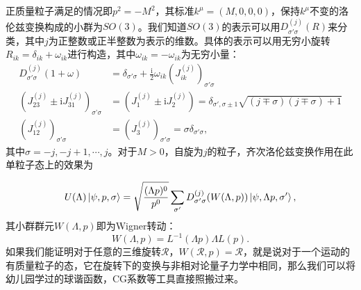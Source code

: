 正质量粒子满足的情况即$ p^{2} =-M^{2}$，其标准$ k^{\mu } =( M,0,0,0)$，保持$ k^{\mu }$不变的洛伦兹变换构成的小群为$ SO( 3)$。我们知道$ SO( 3)$的表示可以用$ D_{\sigma '\sigma }^{( j)}( R)$来分类，其中$ j$为正整数或正半整数为表示的维数。具体的表示可以用无穷小旋转$ R_{ik} =\delta _{ik} +\omega _{ik}$进行构造，其中$ \omega _{ik} =-\omega _{ik}$为无穷小量：
\begin{equation*}
	\begin{aligned}
		D_{\sigma '\sigma }^{( j)}( 1+\omega ) & =\delta _{\sigma '\sigma } +\frac{\mathrm{i}}{2} \omega _{ik} (J_{ik}^{( j)} )_{\sigma '\sigma }\\
		(J_{23}^{( j)} \pm \mathrm{i} J_{31}^{( j)} )_{\sigma ’\sigma } & =(J_{1}^{( j)} \pm \mathrm{i} J_{2}^{( j)} )=\delta _{\sigma ',\sigma \pm 1}\sqrt{( j\mp \sigma )( j\mp \sigma ) +1}\\
		(J_{12}^{( j)} )_{\sigma ’\sigma } & =(J_{3}^{( j)} )_{\sigma '\sigma } =\sigma \delta _{\sigma '\sigma } ,
	\end{aligned}
\end{equation*}
其中$ \sigma =-j,-j+1,\cdots ,j$。对于$ M >0$，自旋为$ j$的粒子，齐次洛伦兹变换作用在此单粒子态上的效果为

\begin{equation}
	U( \Lambda )\ket{\psi ,p,\sigma } =\sqrt{\frac{( \Lambda p)^{0}}{p^{0}}}\sum _{\sigma '} D_{\sigma '\sigma }^{( j)}( W( \Lambda ,p))\ket{\psi ,\Lambda p,\sigma '} ,
	\label{eq:lorentz_trans_on_single_particle_state}
\end{equation}其小群群元$ W( \Lambda ,p)$即为Wigner转动：
\begin{equation}
	W( \Lambda ,p) =L^{-1}( \Lambda p) \Lambda L( p) .
	\label{eq:little_grp_element}
\end{equation}
如果我们能证明对于任意的三维旋转$ \mathcal{R}$，$ W(\mathcal{R} ,p) =\mathcal{R}$，就是说对于一个运动的有质量粒子的态，它在旋转下的变换与非相对论量子力学中相同，那么我们可以将幼儿园学过的球谐函数，CG系数等工具直接照搬过来。


